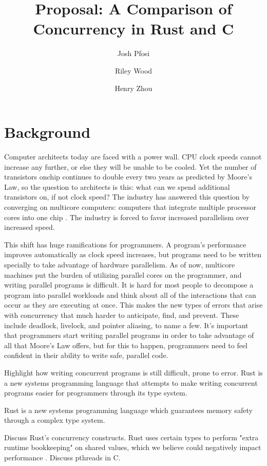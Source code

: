 \documentclass{article}
\title{Proposal: A Comparison of Concurrency in Rust and C}
\author{
    Josh Pfosi\\
    \and
    Riley Wood\\
    \and
    Henry Zhou\\
}
\begin{document}
\maketitle


\section*{Background}

Computer architects today are faced with a power wall. CPU clock speeds cannot increase any further, or else they will be unable to be cooled. Yet the number of transistors onchip continues to double every two years as predicted by Moore's Law, so the question to architects is this: what can we spend additional transistors on, if not clock speed? The industry has answered this question by converging on multicore computers: computers that integrate multiple processor cores into
one chip \cite{Larus:2009}. The industry is forced to favor increased parallelism over increased speed.

This shift has huge ramifications for programmers. A program's performance improves automatically as clock speed increases, but programs need to be written specially to take advantage of hardware parallelism. As of now, multicore machines put the burden of utilizing parallel cores on the programmer, and writing parallel programs is difficult. It is hard for most people to decompose a program into parallel workloads and think about all of the interactions that can occur as they
are executing at once. This makes the new types of errors that arise with concurrency that much harder to anticipate, find, and prevent. These include deadlock, livelock, and pointer aliasing, to name a few. It's important that programmers start writing parallel programs in order to take advantage of all that Moore's Law offers, but for this to happen, programmers need to feel confident in their ability to write safe, parallel code.

Highlight how writing concurrent programs is still difficult, prone to error. Rust is a new systems programming language that attempts to make writing concurrent programs easier for programmers through its type system. 

Rust is a new systems programming language which guarantees memory safety through a complex type system. 

Discuss Rust's concurrency constructs. Rust uses certain types to perform "extra runtime bookkeeping" on shared values, which we believe could negatively impact performance \cite{rust-lang.org}. Discuss pthreads in C.
\end{document}

